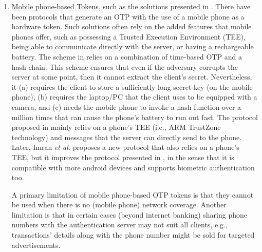 \begin{enumerate}
%
\item \underline{Mobile phone-based Tokens}, such as the solutions presented in \cite{SARA22,KoganMB17,KonothFFARB20}. There have been protocols that generate an OTP with the use of a mobile phone as a hardware token. Such solutions often rely on the added features that mobile phones offer, such as possessing a Trusted Execution Environment (TEE), being able to communicate directly with the server, or having a rechargeable battery. The scheme in \cite{KoganMB17} relies on a combination of time-based OTP and a hash chain. This scheme ensures that even if the adversary corrupts the server at some point, then it cannot extract the client's secret. Nevertheless, it  (a) requires the client to store a sufficiently long secret key (on the mobile phone), (b) requires the laptop/PC that the client uses to be equipped with a camera, and (c) needs the mobile phone to invoke a hash function over a million times that can cause the phone's battery to run out fast. The protocol proposed in \cite{KonothFFARB20} mainly relies on a phone's TEE (i.e.,  ARM TrustZone technology) and messages that the server can directly send to the phone. Later,  Imran \textit{et al.} \cite{SARA22} proposes a new protocol that also relies on a phone's TEE, but it improves the protocol presented in \cite{KonothFFARB20}, in the sense that it is compatible with more android devices and supports biometric authentication too. 

A primary limitation of mobile phone-based OTP tokens is that they cannot be used when there is no (mobile phone) network coverage. Another limitation is that in certain cases (beyond internet banking) sharing phone numbers with the authentication server may not suit all clients, e.g., transactions' details along with the phone number might be sold for targeted advertisements. 
%
\end{enumerate}




%







